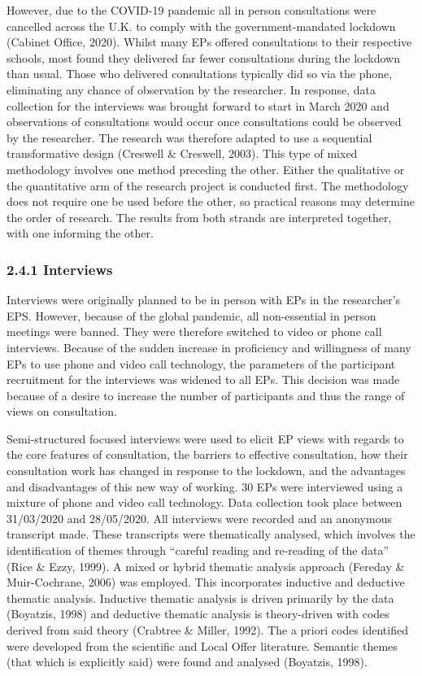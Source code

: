 \documentclass[
  english,
  man]{apa7}
\begin{document}
However, due to the COVID-19 pandemic all in person consultations were cancelled across the U.K. to comply with the government-mandated lockdown (Cabinet Office, 2020). Whilst many EPs offered consultations to their respective schools, most found they delivered far fewer consultations during the lockdown than usual. Those who delivered consultations typically did so via the phone, eliminating any chance of observation by the researcher. In response, data collection for the interviews was brought forward to start in March 2020 and observations of consultations would occur once consultations could be observed by the researcher. The research was therefore adapted to use a sequential transformative design (Creswell \& Creswell, 2003). This type of mixed methodology involves one method preceding the other. Either the qualitative or the quantitative arm of the research project is conducted first. The methodology does not require one be used before the other, so practical reasons may determine the order of research. The results from both strands are interpreted together, with one informing the other.

\hypertarget{interviews-1}{%
\subsubsection{2.4.1 Interviews}\label{interviews-1}}

Interviews were originally planned to be in person with EPs in the researcher's EPS. However, because of the global pandemic, all non-essential in person meetings were banned. They were therefore switched to video or phone call interviews. Because of the sudden increase in proficiency and willingness of many EPs to use phone and video call technology, the parameters of the participant recruitment for the interviews was widened to all EPs. This decision was made because of a desire to increase the number of participants and thus the range of views on consultation.

Semi-structured focused interviews were used to elicit EP views with regards to the core features of consultation, the barriers to effective consultation, how their consultation work has changed in response to the lockdown, and the advantages and disadvantages of this new way of working. 30 EPs were interviewed using a mixture of phone and video call technology. Data collection took place between 31/03/2020 and 28/05/2020. All interviews were recorded and an anonymous transcript made. These transcripts were thematically analysed, which involves the identification of themes through ``careful reading and re-reading of the data'' (Rice \& Ezzy, 1999). A mixed or hybrid thematic analysis approach (Fereday \& Muir-Cochrane, 2006) was employed. This incorporates inductive and deductive thematic analysis. Inductive thematic analysis is driven primarily by the data (Boyatzis, 1998) and deductive thematic analysis is theory-driven with codes derived from said theory (Crabtree \& Miller, 1992). The a priori codes identified were developed from the scientific and Local Offer literature. Semantic themes (that which is explicitly said) were found and analysed (Boyatzis, 1998).
\end{document}
